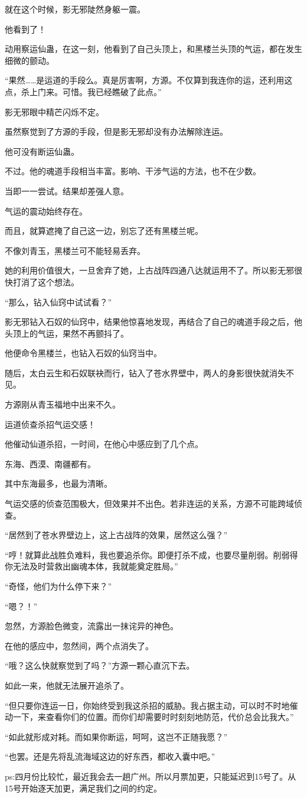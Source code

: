 \begin{this_body}
就在这个时候，影无邪陡然身躯一震。

他看到了！

动用察运仙蛊，在这一刻，他看到了自己头顶上，和黑楼兰头顶的气运，都在发生细微的颤动。

“果然……是运道的手段么。真是厉害啊，方源。不仅算到我连你的运，还利用这点，杀上门来。可惜。我已经瞧破了此点。”

影无邪眼中精芒闪烁不定。

虽然察觉到了方源的手段，但是影无邪却没有办法解除连运。

他可没有断运仙蛊。

不过。他的魂道手段相当丰富。影响、干涉气运的方法，也不在少数。

当即一一尝试。结果却差强人意。

气运的震动始终存在。

而且，就算遮掩了自己这一边，别忘了还有黑楼兰呢。

不像刘青玉，黑楼兰可不能轻易丢弃。

她的利用价值很大，一旦舍弃了她，上古战阵四通八达就运用不了。所以影无邪很快打消了这个想法。

“那么，钻入仙窍中试试看？”

影无邪钻入石奴的仙窍中，结果他惊喜地发现，再结合了自己的魂道手段之后，他头顶上的气运，果然不再颤抖了。

他便命令黑楼兰，也钻入石奴的仙窍当中。

随后，太白云生和石奴联袂而行，钻入了苍水界壁中，两人的身影很快就消失不见。

方源刚从青玉福地中出来不久。

运道侦查杀招气运交感！

他催动仙道杀招，一时间，在他心中感应到了几个点。

东海、西漠、南疆都有。

其中东海最多，也最为清晰。

气运交感的侦查范围极大，但效果并不出色。若非连运的关系，方源不可能跨域侦查。

“居然到了苍水界壁边上，这上古战阵的效果，居然这么强？”

“哼！就算此战胜负难料，我也要追杀你。即便打杀不成，也要尽量削弱。削弱得你无法及时营救出幽魂本体，我就能奠定胜局。”

“奇怪，他们为什么停下来？”

“嗯？！”

忽然，方源脸色微变，流露出一抹诧异的神色。

在他的感应中，忽然间，两个点消失了。

“哦？这么快就察觉到了吗？”方源一颗心直沉下去。

如此一来，他就无法展开追杀了。

“但只要你连运一日，你始终受到我这杀招的威胁。我占据主动，可以时不时地催动一下，来查看你们的位置。而你们却需要时时刻刻地防范，代价总会比我大。”

“如此就形成对耗。而如果你断运，呵呵，这岂不正随我愿？”

“也罢。还是先将乱流海域这边的好东西，都收入囊中吧。”

ps:四月份比较忙，最近我会去一趟广州。所以月票加更，只能延迟到15号了。从15号开始逐天加更，满足我们之间的约定。

\end{this_body}

